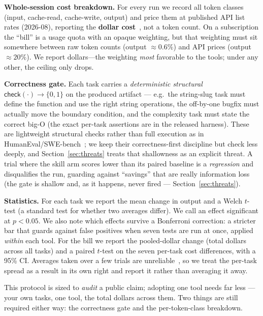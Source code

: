 \textbf{Whole-session cost breakdown.} For every run we record all token classes (input,
cache-read, cache-write, output) and price them at published API list rates (2026-08), reporting the \textbf{dollar
cost}~\cite{chen2023frugalgpt,schwartz2020greenai}, not a token count. On a subscription the ``bill''
is a usage quota with an opaque weighting, but that weighting must sit somewhere between raw token
counts (output ${\approx}0.6\%$) and API prices (output ${\approx}20\%$). We report dollars---the
weighting \emph{most} favorable to the tools; under any other, the ceiling only drops.

\textbf{Correctness gate.} Each task carries a \emph{deterministic structural}
$\textsf{check}(\cdot)\rightarrow\{0,1\}$ on the produced artifact --- e.g.\ the string-slug task must
define the function and use the right string operations, the off-by-one bugfix must actually move the
boundary condition, and the complexity task must state the correct big-O (the exact per-task assertions
are in the released harness).
These are lightweight structural checks rather than full execution as in HumanEval/SWE-bench~\cite{chen2021humaneval,jimenez2024swebench};
we keep their correctness-first discipline but check less deeply, and Section~\ref{sec:threats} treats that
shallowness as an explicit threat. A trial where the skill arm scores lower than its paired
baseline is a \emph{regression} and disqualifies the run, guarding against ``savings'' that are really
information loss (the gate is shallow and, as it happens, never fired --- Section~\ref{sec:threats}).

\textbf{Statistics.} For each task we report the mean change in output and a Welch $t$-test (a standard
test for whether two averages differ). We call an effect significant at $p<0.05$. We also note which
effects survive a Bonferroni correction: a stricter bar that guards against false positives when seven
tests are run at once, applied \emph{within} each tool. For the bill we report the pooled-dollar change
(total dollars across all tasks) and a paired $t$-test on the seven per-task cost differences, with a
95\% CI\@. Averages taken over a few trials are unreliable~\cite{agarwal2021precipice}, so we treat the
per-task spread as a result in its own right and report it rather than averaging it away.

This protocol is sized to \emph{audit} a public claim; adopting one tool needs far less --- your own
tasks, one tool, the total dollars across them. Two things are still required either way: the
correctness gate and the per-token-class breakdown.

